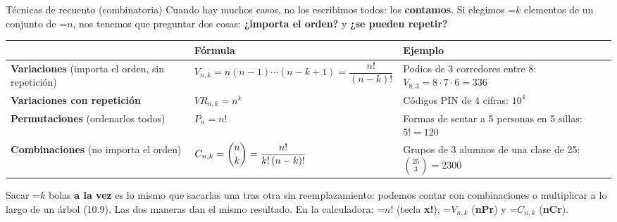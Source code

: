 \documentclass[11pt,a4paper]{article}
\newcommand{\fmm}[1]{\setbox0=\hbox{$#1$}\ifdim\wd0>\linewidth\fmdisp{#1}\else\mbox{\box0}\fi}
\newcommand{\fmdisp}[1]{\[\setbox2=\hbox{$\displaystyle #1$}\ifdim\wd2>\linewidth\resizebox{\linewidth}{!}{\box2}\else\box2\fi\]}
\begin{document}
\begin{fmdef}{Técnicas de recuento (combinatoria)}
Cuando hay muchos casos, no los escribimos todos: los \textbf{contamos}. Si elegimos \fmm{k} elementos de un conjunto de \fmm{n}, nos tenemos que preguntar dos cosas: \textbf{¿importa el orden?} y \textbf{¿se pueden repetir?}

\begin{center}\renewcommand{\arraystretch}{1.5}\small\begin{tabularx}{\linewidth}{>{\raggedright\arraybackslash}p{3.2cm}>{\raggedright\arraybackslash}X>{\raggedright\arraybackslash}X}\toprule
\textbf{} & \textbf{Fórmula} & \textbf{Ejemplo}\\\midrule
\textbf{Variaciones} (importa el orden, sin repetición) & $V_{n,k}=n(n-1)\cdots(n-k+1)=\dfrac{n!}{(n-k)!}$ & Podios de 3 corredores entre 8: $V_{8,3}=8\cdot7\cdot6=336$\\[3pt]
\textbf{Variaciones con repetición} & $VR_{n,k}=n^k$ & Códigos PIN de 4 cifras: $10^4$\\[3pt]
\textbf{Permutaciones} (ordenarlos todos) & $P_n=n!$ & Formas de sentar a 5 personas en 5 sillas: $5!=120$\\[3pt]
\textbf{Combinaciones} (no importa el orden) & $C_{n,k}=\dbinom nk=\dfrac{n!}{k!\,(n-k)!}$ & Grupos de 3 alumnos de una clase de 25: $\binom{25}{3}=2300$\\[3pt]
\bottomrule\end{tabularx}\end{center}

\begin{fmnote}Sacar \fmm{k} bolas \textbf{a la vez} es lo mismo que sacarlas una tras otra sin reemplazamiento: podemos contar con combinaciones o multiplicar a lo largo de un árbol (10.9). Las dos maneras dan el mismo resultado. En la calculadora: \fmm{n!} (tecla \textbf{x!}), \fmm{V_{n,k}} (\textbf{nPr}) y \fmm{C_{n,k}} (\textbf{nCr}).\end{fmnote}
\end{fmdef}
\end{document}
